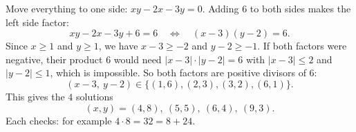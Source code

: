Move everything to one side: $xy-2x-3y=0$. Adding $6$ to both sides makes the left side factor:
\[
xy-2x-3y+6=6\quad\Longleftrightarrow\quad (x-3)(y-2)=6 .
\]
Since $x\ge1$ and $y\ge1$, we have $x-3\ge-2$ and $y-2\ge-1$. If both factors were negative, their product $6$ would need $|x-3|\cdot|y-2|=6$ with $|x-3|\le2$ and $|y-2|\le1$, which is impossible. So both factors are positive divisors of $6$:
\[
(x-3,\ y-2)\in\{(1,6),(2,3),(3,2),(6,1)\}.
\]
This gives the $4$ solutions
\[
\boxed{(x,y)=(4,8),\ (5,5),\ (6,4),\ (9,3)} .
\]
Each checks: for example $4\cdot8=32=8+24$.
